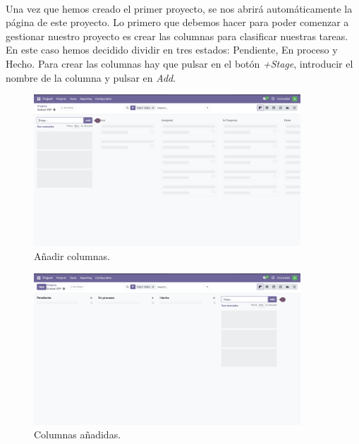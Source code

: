 \documentclass[paper=a4wide, fontsize=11pt]{report}	 %
\begin{document}
\paragraph{}
Una vez que hemos creado el primer proyecto, se nos abrirá automáticamente la página de este proyecto. Lo primero que debemos hacer para poder comenzar a gestionar nuestro proyecto es crear las columnas para clasificar nuestras tareas. En este caso hemos decidido dividir en tres estados: Pendiente, En proceso y Hecho. Para crear las columnas hay que pulsar en el botón \textit{+Stage}, introducir el nombre de la columna y pulsar en \textit{Add}.
\begin{figure}[h]
    \centering
    \includegraphics[width=10cm]{addColProject.png}
    \caption{Añadir columnas.}
    \label{fig:openProyectos}
\end{figure}
\begin{figure}[h]
    \centering
    \includegraphics[width=10cm]{colsAddedProject.png}
    \caption{Columnas añadidas.}
    \label{fig:openProyectos}
\end{figure}
\end{document}
